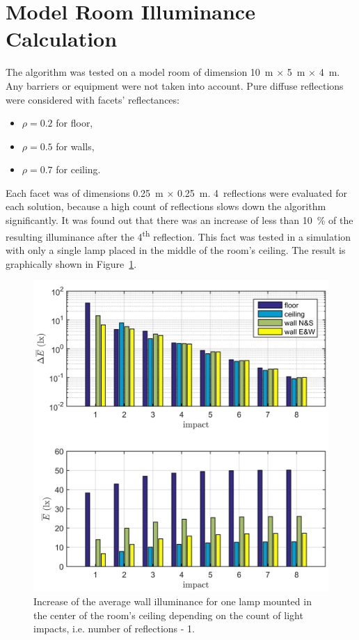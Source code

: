 \section{Model Room Illuminance Calculation}
The algorithm was tested on a model room of dimension 10~m $\times$ 5~m $\times$ 4~m. Any barriers or equipment were not taken into account. Pure diffuse reflections were considered with facets' reflectances:
\begin{itemize}
	\item $\rho = 0.2$ for floor,
	\item $\rho = 0.5$ for walls,
	\item $\rho = 0.7$ for ceiling.
\end{itemize}
Each facet was of dimensions 0.25~m $\times$ 0.25~m. 4~reflections were evaluated for each solution, because a high count of reflections slows down the algorithm significantly. It was found out that there was an increase of less than 10~\% of the resulting illuminance after the 4\textsuperscript{th} reflection. This fact was tested in a simulation with only a single lamp placed in the middle of the room's ceiling. The result is graphically shown in Figure~\ref{fig:reflDif}.

\begin{figure}[htb]
  \centering
  \includegraphics[width=\columnwidth]{reflDif}
  \caption{Increase of the average wall illuminance for one lamp mounted in the center of the room's ceiling depending on the count of light impacts, i.e. number of reflections - 1.}
  \label{fig:reflDif}
\end{figure}

